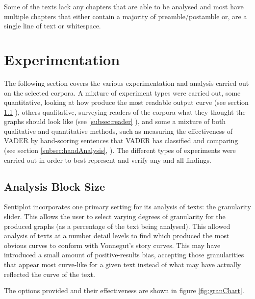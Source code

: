 \documentclass{article}
\begin{document}
            Some of the texts lack any chapters that are able to be analysed and most have multiple chapters that either contain a majority of preamble/postamble or, are a single line of text or whitespace.
\newpage
\section{Experimentation}
\label{sec:experiments}
The following section covers the various experimentation and analysis carried out on the selected corpora. A mixture of experiment types were carried out, some quantitative, looking at how produce the most readable output curve (see section \ref{subsec:blockSize} ), others qualitative, surveying readers of the corpora what they thought the graphs should look like (see \ref{subsec:reader} ), and some a mixture of both qualitative and quantitative methods, such as measuring the effectiveness of VADER by hand-scoring sentences that VADER has classified and comparing (see section \ref{subsec:handAnalysis}, ). The different types of experiments were carried out in order to best represent and verify any and all findings.

    \subsection{Analysis Block Size}
    \label{subsec:blockSize}
        Sentiplot incorporates one primary setting for its analysis of texts: the granularity slider. This allows the user to select varying degrees of granularity for the produced graphs (as a percentage of the text being analysed). This allowed analysis of texts at a number detail levels to find which produced the most obvious curves to conform with Vonnegut's story curves. This may have introduced a small amount of positive-results bias, accepting those granularities that appear most curve-like for a given text instead of what may have actually reflected the curve of the text.

        The options provided and their effectiveness are shown in figure \ref{fig:granChart}.
        
\end{document}
